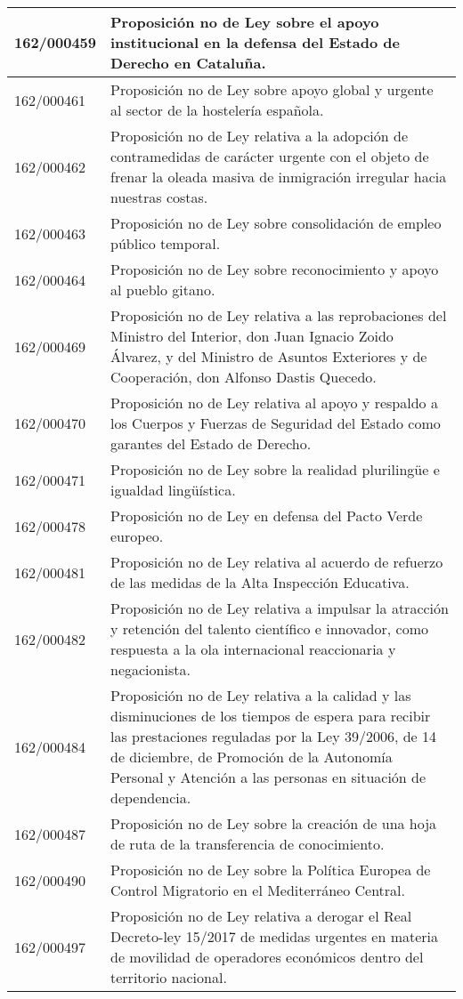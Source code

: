 {\begin{table}[H]
\begin{center}
\begin{tabularx}{\linewidth}{| l | X |}
\hline
162/000459 & Proposición no de Ley sobre el apoyo institucional en la defensa del Estado de Derecho en Cataluña. \\
\hline
162/000461 & Proposición no de Ley sobre apoyo global y urgente al sector de la hostelería española. \\
\hline
162/000462 & Proposición no de Ley relativa a la adopción de contramedidas de carácter urgente con el objeto de frenar la oleada masiva de inmigración irregular hacia nuestras costas. \\
\hline
162/000463 & Proposición no de Ley sobre consolidación de empleo público temporal. \\
\hline
162/000464 & Proposición no de Ley sobre reconocimiento y apoyo al pueblo gitano. \\
\hline
162/000469 & Proposición no de Ley relativa a las reprobaciones del Ministro del Interior, don Juan Ignacio Zoido Álvarez, y del Ministro de Asuntos Exteriores y de Cooperación, don Alfonso Dastis Quecedo. \\
\hline
162/000470 & Proposición no de Ley relativa al apoyo y respaldo a los Cuerpos y Fuerzas de Seguridad del Estado como garantes del Estado de Derecho. \\
\hline
162/000471 & Proposición no de Ley sobre la realidad plurilingüe e igualdad lingüística. \\
\hline
162/000478 & Proposición no de Ley en defensa del Pacto Verde europeo. \\
\hline
162/000481 & Proposición no de Ley relativa al acuerdo de refuerzo de las medidas de la Alta Inspección Educativa. \\
\hline
162/000482 & Proposición no de Ley relativa a impulsar la atracción y retención del talento científico e innovador, como respuesta a la ola internacional reaccionaria y negacionista. \\
\hline
162/000484 & Proposición no de Ley relativa a la calidad y las disminuciones de los tiempos de espera para recibir las prestaciones reguladas por la Ley 39/2006, de 14 de diciembre, de Promoción de la Autonomía Personal y Atención a las personas en situación de dependencia. \\
\hline
162/000487 & Proposición no de Ley sobre la creación de una hoja de ruta de la transferencia de conocimiento. \\
\hline
162/000490 & Proposición no de Ley sobre la Política Europea de Control Migratorio en el Mediterráneo Central. \\
\hline
162/000497 & Proposición no de Ley relativa a derogar el Real Decreto-ley 15/2017 de medidas urgentes en materia de movilidad de operadores económicos dentro del territorio nacional. \\

\end{tabularx}
\end{center}
\end{table}}
